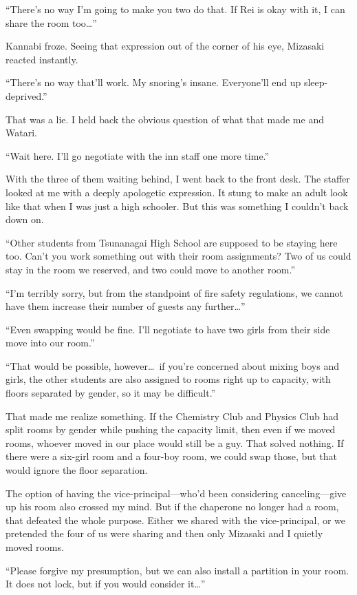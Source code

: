 \documentclass[
    a4paper,
    12pt,
    twoside,
    openany,
    UTF8,
    fontset=windows
]{ctexbook}
\begin{document}
``There's no way I'm going to make you two do that. If Rei is okay with it, I can share the room too\dots''

Kannabi froze. Seeing that expression out of the corner of his eye, Mizasaki reacted instantly.

``There's no way that'll work. My snoring's insane. Everyone'll end up sleep-deprived.''

That was a lie. I held back the obvious question of what that made me and Watari.

``Wait here. I'll go negotiate with the inn staff one more time.''

With the three of them waiting behind, I went back to the front desk. The staffer looked at me with a deeply apologetic expression. It stung to make an adult look like that when I was just a high schooler. But this was something I couldn't back down on.

``Other students from Tsunanagai High School are supposed to be staying here too. Can't you work something out with their room assignments? Two of us could stay in the room we reserved, and two could move to another room.''

``I'm terribly sorry, but from the standpoint of fire safety regulations, we cannot have them increase their number of guests any further\dots''

``Even swapping would be fine. I'll negotiate to have two girls from their side move into our room.''

``That would be possible, however\dots\ if you're concerned about mixing boys and girls, the other students are also assigned to rooms right up to capacity, with floors separated by gender, so it may be difficult.''

That made me realize something. If the Chemistry Club and Physics Club had split rooms by gender while pushing the capacity limit, then even if we moved rooms, whoever moved in our place would still be a guy. That solved nothing. If there were a six-girl room and a four-boy room, we could swap those, but that would ignore the floor separation.

The option of having the vice-principal---who'd been considering canceling---give up his room also crossed my mind. But if the chaperone no longer had a room, that defeated the whole purpose. Either we shared with the vice-principal, or we pretended the four of us were sharing and then only Mizasaki and I quietly moved rooms.

``Please forgive my presumption, but we can also install a partition in your room. It does not lock, but if you would consider it\dots''
\end{document}
